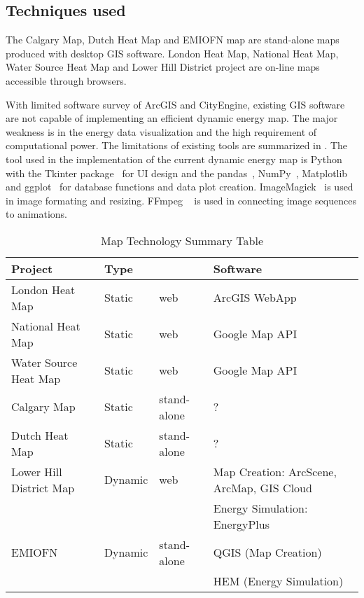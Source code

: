 \subsection{Techniques used}
The Calgary Map, Dutch Heat Map and EMIOFN map are stand-alone maps
produced with desktop GIS software. London Heat Map, National Heat
Map, Water Source Heat Map and Lower Hill District project are on-line
maps accessible through browsers. 

With limited software survey of ArcGIS and CityEngine, existing GIS
software are not capable of implementing an efficient dynamic energy
map. The major weakness is in the energy data visualization and the
high requirement of computational power. The limitations of existing
tools are summarized in . The tool used in the
implementation of the current dynamic energy map is
Python~\cite{python2015} with the Tkinter package~\cite{Tkinter2014}
for UI design and the pandas~\cite{pandas2015},
NumPy~\cite{NumPy2015}, Matplotlib~\cite{matplotlib2015} and
ggplot~\cite{ggplot2015} for database functions and data plot
creation. ImageMagick~\cite{ImageMagick2015} is used in image
formating and resizing. FFmpeg ~\cite{FFmpeg2015} is used in
connecting image sequences to animations.

\begin{table}[h!]
\centering
\caption{Map Technology Summary Table}
\label{tab:mapSummary}
\begin{tabular}{p{3cm}|p{3cm}|p{3cm}|p{3cm}}
  \hline
Project                 & Type    &             & Software                                  \\
  \hline
  \hline
London Heat Map         & Static  & web         & ArcGIS WebApp                             \\
  \hline
National Heat Map       & Static  & web         & Google Map API                            \\
  \hline
Water Source Heat Map   & Static  & web         & Google Map API                            \\
  \hline
Calgary Map             & Static  & stand-alone & ?                                         \\
  \hline
Dutch Heat Map          & Static  & stand-alone & ?                                         \\
  \hline
  \hline
Lower Hill District Map & Dynamic & web         & Map Creation: ArcScene, ArcMap, GIS Cloud \\
                        &         &             & Energy Simulation: EnergyPlus             \\
  \hline
EMIOFN                  & Dynamic & stand-alone & QGIS (Map Creation)                       \\
                        &         &             & HEM (Energy Simulation)                  \\
  \hline
\end{tabular}
\end{table}

